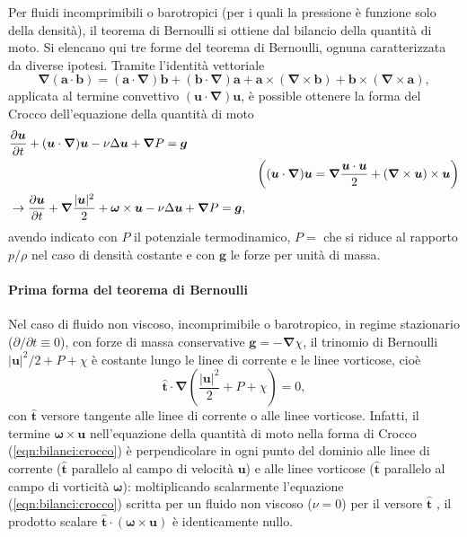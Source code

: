 Per fluidi incomprimibili o barotropici (per i quali la pressione è funzione solo della densità), il teorema di Bernoulli si ottiene dal bilancio della quantità di moto. Si elencano qui tre forme del teorema di Bernoulli, ognuna caratterizzata da diverse ipotesi.
%
Tramite l'identità vettoriale
\begin{equation}
  \bm{\nabla} (\bm{a} \cdot \bm{b}) = (\bm{a} \cdot \bm{\nabla}) \bm{b} +  (\bm{b} \cdot \bm{\nabla}) \bm{a} + \bm{a} \times (\bm{\nabla} \times \bm{b}) + \bm{b} \times (\bm{\nabla} \times \bm{a}),
\end{equation}
applicata al termine convettivo $(\bm{u} \cdot \bm{\nabla}) \bm{u}$, è possible ottenere la forma del Crocco dell'equazione della quantità di moto
\begin{equation}\label{eqn:bilanci:crocco}
\begin{aligned}
 & \dfrac{\partial{\bm{u}}}{\partial{t}} + (\bm{u} \cdot \bm{\nabla}) \bm{u} - \nu \Delta \bm{u} + \bm{\nabla} P = \bm{g}  & \\ &  &  \bigg( (\bm{u} \cdot \bm{\nabla})\bm{u} = \bm{\nabla} \frac{\bm{u} \cdot \bm{u}}{2} + (\bm{\nabla} \times \bm{u}) \times \bm{u} \bigg) \\
 & \rightarrow \dfrac{\partial{\bm{u}}}{\partial{t}} + \bm{\nabla} \frac{|\bm{u}|^2}{2} + \bm{\omega} \times \bm{u} - \nu \Delta \bm{u} + \bm{\nabla} P = \bm{g} , & \\
\end{aligned}
\end{equation}
avendo indicato con $P$ il potenziale termodinamico, $P = $ che si riduce al rapporto $p/\rho$ nel caso di densità costante e con $\bm{g}$ le forze per unità di massa.
\paragraph{Prima forma del teorema di Bernoulli}
Nel caso di fluido non viscoso, incomprimibile o barotropico, in regime stazionario ($\partial / \partial t \equiv 0$), con forze di massa conservative $\bm{g} = -\bm{\nabla} \chi$, il trinomio di Bernoulli $|\bm{u}|^2/2 + P + \chi$ è costante lungo le linee di corrente e le linee vorticose, cioè
\begin{equation}
 \bm{\hat{t}} \cdot \bm{\nabla} \left( \frac{|\bm{u}|^2}{2} + P + \chi \right) = 0 ,
\end{equation}
con $\bm{\hat{t}}$ versore tangente alle linee di corrente o alle linee vorticose. Infatti, il termine $\bm{\omega} \times \bm{u}$ nell'equazione della quantità di moto nella forma di Crocco (\ref{eqn:bilanci:crocco}) è perpendicolare in ogni punto del dominio alle linee di corrente ($\bm{\hat{t}}$ parallelo al campo di velocità $\bm{u}$) e alle linee vorticose ($\bm{\hat{t}}$ parallelo al campo di vorticità $\bm{\omega}$): moltiplicando scalarmente l'equazione (\ref{eqn:bilanci:crocco}) scritta per un fluido non viscoso ($\nu = 0$) per il versore $\bm{\hat{t}}$ , il prodotto scalare $\bm{\hat{t}} \cdot (\bm{\omega} \times \bm{u})$ è identicamente nullo.
